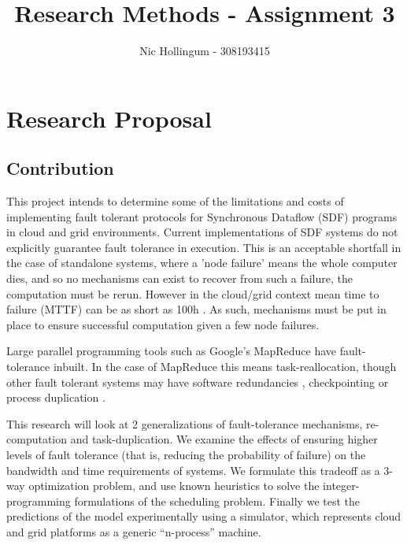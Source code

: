 
\author{Nic Hollingum - 308193415}
\title{Research Methods - Assignment 3}

\addtolength{\oddsidemargin}{-.875in}
\addtolength{\evensidemargin}{-.875in}
\addtolength{\textwidth}{1.75in}
\addtolength{\topmargin}{-.875in}
\addtolength{\textheight}{1.75in}



\maketitle

\section*{Research Proposal}

\subsection*{Contribution}
This project intends to determine some of the limitations and costs of implementing fault tolerant protocols for Synchronous Dataflow (SDF) programs in cloud and grid environments.
Current implementations of SDF systems \cite{mal08, thies02, thies10} do not explicitly guarantee fault tolerance in execution.
This is an acceptable shortfall in the case of standalone systems, where a 'node failure' means the whole computer dies, and so no mechanisms can exist to recover from such a failure, the computation must be rerun.
However in the cloud/grid context mean time to failure (MTTF) can be as short as 100h \cite{ree06}.
As such, mechanisms must be put in place to ensure successful computation given a few node failures.

Large parallel programming tools such as Google's MapReduce \cite{dea08} have fault-tolerance inbuilt.
In the case of MapReduce this means task-reallocation, though other fault tolerant systems may have software redundancies \cite{ran75}, checkpointing \cite{li10} or process duplication \cite{lit07}.

This research will look at 2 generalizations of fault-tolerance mechanisms, re-computation and task-duplication.
We examine the effects of ensuring higher levels of fault tolerance (that is, reducing the probability of failure) on the bandwidth and time requirements of systems.
We formulate this tradeoff as a 3-way optimization problem, and use known heuristics to solve the integer-programming formulations of the scheduling problem.
Finally we test the predictions of the model experimentally using a simulator, which represents cloud and grid platforms as a generic ``n-process'' machine.


